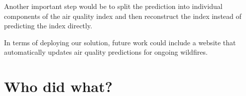 \documentclass[a4paper,12pt]{article}
\begin{document}
Another important step would be to split the prediction into individual components of the air quality index and then reconstruct the index instead of predicting the index directly.

In terms of deploying our solution, future work could include a website that automatically updates air quality predictions for ongoing wildfires.

\section{Who did what?}

\nocite{*}
\printbibliography[title={Bibliography},heading=bibliography]
\end{document}
